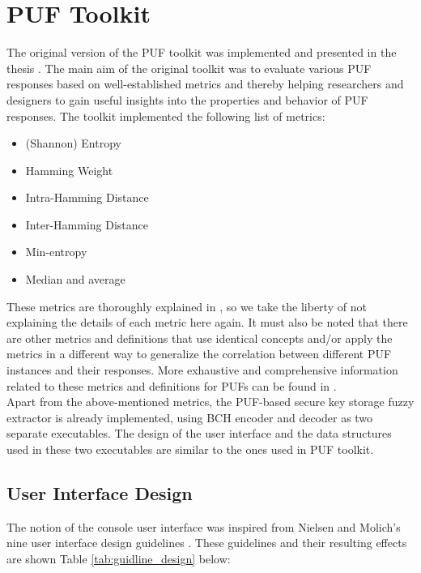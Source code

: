 \section{PUF Toolkit}
The original version of the PUF toolkit was implemented and presented in the thesis \cite{71}. The main aim of the original toolkit was to evaluate various PUF responses based on well-established metrics and thereby helping researchers and designers to gain useful insights into the properties and behavior of PUF responses. The toolkit implemented the following list of metrics:

\begin{itemize}
	\item (Shannon) Entropy
	\item Hamming Weight
	\item Intra-Hamming Distance
	\item Inter-Hamming Distance
	\item Min-entropy
	\item Median and average
\end{itemize}

These metrics are thoroughly explained in \cite{71}, so we take the liberty of not explaining the details of each metric here again. It must also be noted that there are other metrics and definitions that use identical concepts and/or apply the metrics in a different way to generalize the correlation between different PUF instances and their responses. More exhaustive and comprehensive information related to these metrics and definitions for PUFs can be found in \cite{60,64,24,61}.\\

Apart from the above-mentioned metrics, the PUF-based secure key storage fuzzy extractor is already implemented, using BCH encoder and decoder as two separate executables. The design of the user interface and the data structures used in these two executables are similar to the ones used in PUF toolkit.\\

\subsection{User Interface Design}

The notion of the console user interface was inspired from Nielsen and Molich's nine user interface design guidelines \cite{67}. These guidelines and their resulting effects are shown Table \ref{tab:guidline_design} below:


